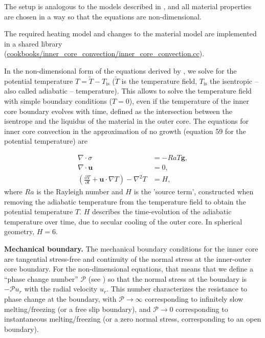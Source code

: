 \documentclass{article}
\begin{document}
The setup is analogous to the models described in \cite{Deguen2013}, and all material properties 
are chosen in a way so that the equations are non-dimensional.

The required heating model and changes to the material model are implemented in a shared library
(\url{cookbooks/inner_core_convection/inner_core_convection.cc}). 

In the non-dimensional form of the equations derived by \cite{Deguen2013}, we solve for the potential temperature $T = \tilde{T}-T_{\text{is}}$ ($\tilde{T}$ is the temperature field, $T_{\text{is}}$ the isentropic -- also called adiabatic -- temperature). This allows to solve the temperature field with simple boundary conditions ($T=0$), even if the temperature of the inner core boundary evolves with time, defined as the intersection between the isentrope and the liquidus of the material in the outer core.  
The equations for inner core convection in the approximation of no growth (equation 59 for the potential temperature) are

\begin{align}
  \label{eq:inner-core-1}
  \nabla \cdot \sigma &=
  -Ra T \mathbf g,
  \\
  \label{eq:inner-core-2}
  \nabla \cdot \mathbf u &= 0,
  \\
  \label{eq:inner-core-3}
  \left(\frac{\partial T}{\partial t} + \mathbf u\cdot\nabla T\right)
  - \nabla^2 T
  &=
  H,
\end{align}
where $Ra$ is the Rayleigh number and $H$ is the 'source term', constructed when removing the adiabatic temperature from the temperature field to obtain the potential temperature $T$. $H$ describes the time-evolution of the adiabatic temperature over time, due to secular cooling of the outer core. 
In spherical geometry, $H=6$. 


\vspace{0.3cm}
\textbf{Mechanical boundary.}
The mechanical boundary conditions for the inner core are
tangential stress-free and continuity of the normal stress at the
inner-outer core boundary. For the non-dimensional equations, that
means that we define a ``phase change number'' $\mathcal{P}$ (see \cite{Deguen2013}) so that the
normal stress at the boundary is $-\mathcal{P} u_r$ with the radial velocity
$u_r$. This number characterizes the resistance to phase change at
the boundary, with $\mathcal{P}\rightarrow\infty$ corresponding to infinitely slow
melting/freezing (or a free slip boundary), and $\mathcal{P}\rightarrow0$ corresponding to
instantaneous melting/freezing (or a zero normal stress, corresponding to an open boundary).
\end{document}
